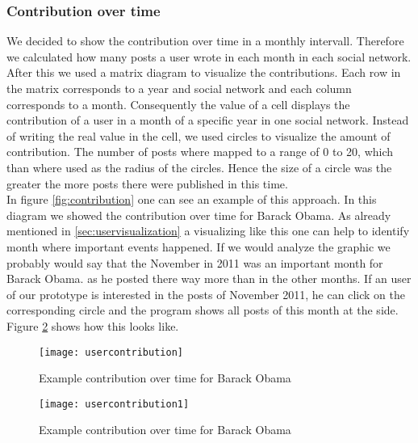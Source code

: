 \subsubsection{Contribution over time}
We decided to show the contribution over time in a monthly intervall. Therefore we calculated how many posts a user wrote in each month in each social network. 
After this we  used a matrix diagram to visualize the contributions. Each row in the matrix corresponds to a year and social network and each column corresponds to a month. Consequently the value of a cell displays the contribution of a user in a month of a specific year in one social network. Instead of writing the real value in the cell, we used circles to visualize the amount of contribution. The number of posts where mapped to a range of 0 to 20, which than where used as the radius of the circles. Hence the size of a circle was the greater the more posts there were published in this time.  \\
In figure \ref{fig:contribution} one can see an example of this approach. In this diagram we showed the contribution over time for Barack Obama. As already mentioned in \ref{sec:uservisualization} a visualizing like this one can help to identify month where important events happened. If we would analyze the graphic we probably would say that the November in 2011 was an important month for Barack Obama. as he posted there way more than in the other months. If an user of our prototype is interested in the posts of November 2011, he can click on the corresponding circle and the program shows all posts of this month at the side. Figure \ref{fig:contributon2} shows how this looks like.  

\begin{figure}[t]
	\centering
	\texttt{[image: usercontribution]}
	\caption[ContributonOverTime]{Example contribution over time for Barack Obama}
	\label{fig:contributon}
\end{figure}

\begin{figure}[t]
	\centering
	\texttt{[image: usercontribution1]}
	\caption[ContributonOverTime]{Example contribution over time for Barack Obama}
	\label{fig:contributon2}
\end{figure}

